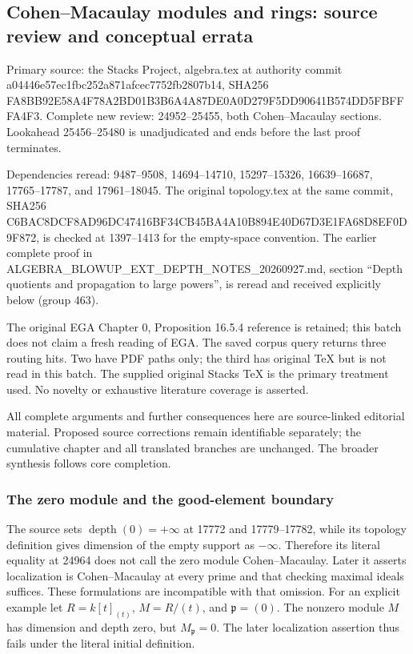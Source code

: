 \subsection{Cohen--Macaulay modules and rings: source review and conceptual errata}\label{cohenmacaulay-modules-and-rings-source-review-and-conceptual-errata}

Primary source: the Stacks Project, algebra.tex at authority commit a04446e57ec1fbc252a871afcec7752fb2807b14, SHA256 FA8BB92E58A4F78A2BD01B3B6A4A87DE0A0D279F5DD90641B574DD5FBFFFA4F3. Complete new review: 24952--25455, both Cohen--Macaulay sections. Lookahead 25456--25480 is unadjudicated and ends before the last proof terminates.

Dependencies reread: 9487--9508, 14694--14710, 15297--15326, 16639--16687, 17765--17787, and 17961--18045. The original topology.tex at the same commit, SHA256 C6BAC8DCF8AD96DC47416BF34CB45BA4A10B894E40D67D3E1FA68D8EF0D9F872, is checked at 1397--1413 for the empty-space convention. The earlier complete proof in ALGEBRA\_BLOWUP\_EXT\_DEPTH\_NOTES\_20260927.md, section ``Depth quotients and propagation to large powers'', is reread and received explicitly below (group 463).

The original EGA Chapter 0, Proposition 16.5.4 reference is retained; this batch does not claim a fresh reading of EGA. The saved corpus query returns three routing hits. Two have PDF paths only; the third has original TeX but is not read in this batch. The supplied original Stacks TeX is the primary treatment used. No novelty or exhaustive literature coverage is asserted.

All complete arguments and further consequences here are source-linked editorial material. Proposed source corrections remain identifiable separately; the cumulative chapter and all translated branches are unchanged. The broader synthesis follows core completion.

\subsubsection{The zero module and the good-element boundary}\label{the-zero-module-and-the-good-element-boundary}

The source sets \(\operatorname{depth}(0)=+\infty\) at 17772 and 17779--17782, while its topology definition gives dimension of the empty support as \(-\infty\). Therefore its literal equality at 24964 does not call the zero module Cohen--Macaulay. Later it asserts localization is Cohen--Macaulay at every prime and that checking maximal ideals suffices. These formulations are incompatible with that omission. For an explicit example let \(R=k[t]_{(t)}\), \(M=R/(t)\), and \(\mathfrak p=(0)\). The nonzero module \(M\) has dimension and depth zero, but \(M_{\mathfrak p}=0\). The later localization assertion thus fails under the literal initial definition.

